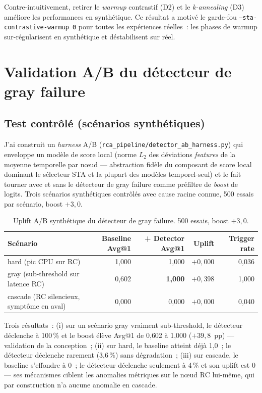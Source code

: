 \documentclass[a4paper,11pt,oneside]{report}
\begin{document}
Contre-intuitivement, retirer le \emph{warmup} contrastif (D2) et le \emph{k-annealing} (D3) am\'eliore les performances en synth\'etique. Ce r\'esultat a motiv\'e le garde-fou \texttt{--sta-contrastive-warmup 0} pour toutes les exp\'eriences r\'eelles~: les phases de warmup sur-r\'egularisent en synth\'etique et d\'estabilisent sur r\'eel.

\section{Validation A/B du d\'etecteur de gray failure}
\label{sec:resultats-ab-gray}

\subsection{Test contr\^ol\'e (sc\'enarios synth\'etiques)}

J'ai construit un \emph{harness} A/B (\texttt{rca\_pipeline/detector\_ab\_harness.py}) qui enveloppe un mod\`ele de score local (norme $L_2$ des d\'eviations \emph{features} de la moyenne temporelle par nœud --- abstraction fid\`ele du composant de score local dominant le s\'electeur STA et la plupart des mod\`eles temporel-seul) et le fait tourner avec et sans le d\'etecteur de gray failure comme pr\'efiltre de \emph{boost} de logits. Trois sc\'enarios synth\'etiques contr\^ol\'es avec cause racine connue, 500 essais par sc\'enario, boost $+3{,}0$.

\begin{table}[ht]
\centering
\caption{Uplift A/B synth\'etique du d\'etecteur de gray failure. 500 essais, boost $+3{,}0$.}
\label{tab:ab-synth}
\begin{tabular}{lrrrr}
\toprule
Sc\'enario & Baseline Avg@1 & + Detector Avg@1 & Uplift & Trigger rate \\
\midrule
hard (pic CPU sur RC) & 1{,}000 & 1{,}000 & $+0{,}000$ & 0{,}036 \\
gray (sub-threshold sur latence RC) & 0{,}602 & \textbf{1{,}000} & \textbf{$+0{,}398$} & 1{,}000 \\
cascade (RC silencieux, sympt\^ome en aval) & 0{,}000 & 0{,}000 & $+0{,}000$ & 0{,}040 \\
\bottomrule
\end{tabular}
\end{table}

Trois r\'esultats~: (i) sur un sc\'enario gray vraiment sub-threshold, le d\'etecteur d\'eclenche \`a 100\,\% et le boost \'el\`eve Avg@1 de 0{,}602 \`a 1{,}000 ($+39{,}8$~pp) --- validation de la conception~; (ii) sur hard, le baseline atteint d\'ej\`a 1{,}0~; le d\'etecteur d\'eclenche rarement (3{,}6\,\%) sans d\'egradation~; (iii) sur cascade, le baseline s'effondre \`a 0~; le d\'etecteur d\'eclenche seulement \`a 4\,\% et son uplift est 0 --- ses m\'ecanismes ciblent les anomalies m\'etriques sur le nœud RC lui-m\^eme, qui par construction n'a aucune anomalie en cascade.
\end{document}
